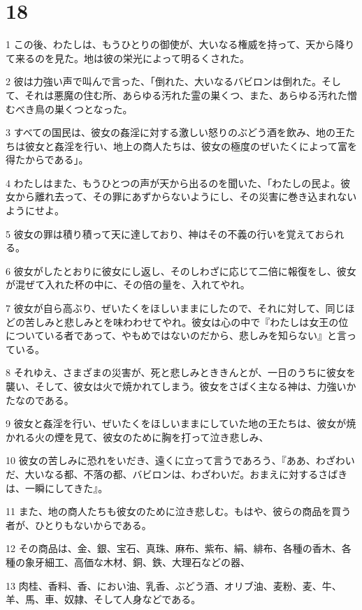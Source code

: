 \chapter{18}

\par 1 この後、わたしは、もうひとりの御使が、大いなる権威を持って、天から降りて来るのを見た。地は彼の栄光によって明るくされた。
\par 2 彼は力強い声で叫んで言った、「倒れた、大いなるバビロンは倒れた。そして、それは悪魔の住む所、あらゆる汚れた霊の巣くつ、また、あらゆる汚れた憎むべき鳥の巣くつとなった。
\par 3 すべての国民は、彼女の姦淫に対する激しい怒りのぶどう酒を飲み、地の王たちは彼女と姦淫を行い、地上の商人たちは、彼女の極度のぜいたくによって富を得たからである」。
\par 4 わたしはまた、もうひとつの声が天から出るのを聞いた、「わたしの民よ。彼女から離れ去って、その罪にあずからないようにし、その災害に巻き込まれないようにせよ。
\par 5 彼女の罪は積り積って天に達しており、神はその不義の行いを覚えておられる。
\par 6 彼女がしたとおりに彼女にし返し、そのしわざに応じて二倍に報復をし、彼女が混ぜて入れた杯の中に、その倍の量を、入れてやれ。
\par 7 彼女が自ら高ぶり、ぜいたくをほしいままにしたので、それに対して、同じほどの苦しみと悲しみとを味わわせてやれ。彼女は心の中で『わたしは女王の位についている者であって、やもめではないのだから、悲しみを知らない』と言っている。
\par 8 それゆえ、さまざまの災害が、死と悲しみとききんとが、一日のうちに彼女を襲い、そして、彼女は火で焼かれてしまう。彼女をさばく主なる神は、力強いかたなのである。
\par 9 彼女と姦淫を行い、ぜいたくをほしいままにしていた地の王たちは、彼女が焼かれる火の煙を見て、彼女のために胸を打って泣き悲しみ、
\par 10 彼女の苦しみに恐れをいだき、遠くに立って言うであろう、『ああ、わざわいだ、大いなる都、不落の都、バビロンは、わざわいだ。おまえに対するさばきは、一瞬にしてきた』。
\par 11 また、地の商人たちも彼女のために泣き悲しむ。もはや、彼らの商品を買う者が、ひとりもないからである。
\par 12 その商品は、金、銀、宝石、真珠、麻布、紫布、絹、緋布、各種の香木、各種の象牙細工、高価な木材、銅、鉄、大理石などの器、
\par 13 肉桂、香料、香、におい油、乳香、ぶどう酒、オリブ油、麦粉、麦、牛、羊、馬、車、奴隷、そして人身などである。

